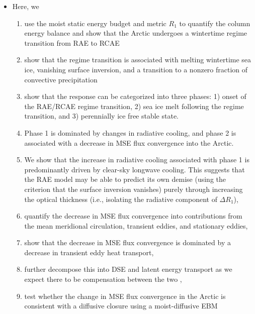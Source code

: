 \documentclass{article}
\begin{document}
\begin{itemize}
    \item Here, we 
    \begin{enumerate}
        \item use the moist static energy budget and metric $R_1$ to quantify the column energy balance and show that the Arctic undergoes a wintertime regime transition from RAE to RCAE
        \item show that the regime transition is associated with melting wintertime sea ice, vanishing surface inversion, and a transition to a nonzero fraction of convective precipitation
        \item show that the response can be categorized into three phases: 1) onset of the RAE/RCAE regime transition, 2) sea ice melt following the regime transition, and 3) perennially ice free stable state.
        \item Phase 1 is dominated by changes in radiative cooling, and phase 2 is associated with a decrease in MSE flux convergence into the Arctic.
        \item We show that the increase in radiative cooling associated with phase 1 is predominantly driven by clear-sky longwave cooling. This suggests that the RAE model \citep{cronin2016} may be able to predict its own demise (using the criterion that the surface inversion vanishes) purely through increasing the optical thickness (i.e., isolating the radiative component of $\Delta R_1$),
        \item quantify the decrease in MSE flux convergence into contributions from the mean meridional circulation, transient eddies, and stationary eddies,
        \item show that the decrease in MSE flux convergence is dominated by a decrease in transient eddy heat transport,
        \item further decompose this into DSE and latent energy transport as we expect there to be compensation between the two \citep{feldl2017},
        \item test whether the change in MSE flux convergence in the Arctic is consistent with a diffusive closure using a moist-diffusive EBM
    \end{enumerate}
\end{itemize}
\end{document}
